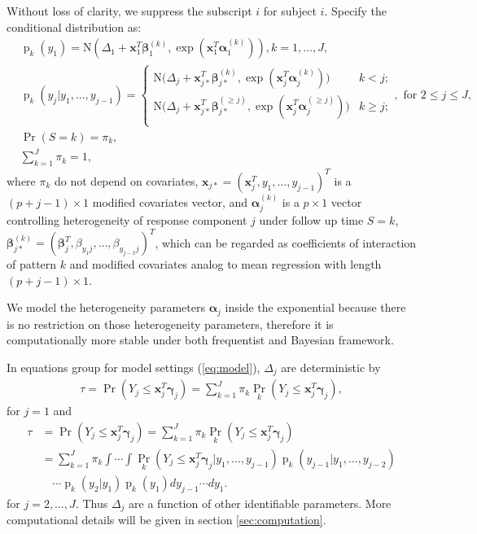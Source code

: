 \documentclass[12pt]{article}
\DeclareMathOperator{\pr}{p}
\DeclareMathOperator{\prob}{Pr}
\begin{document}
Without loss of clarity, we suppress the subscript $i$ for subject
$i$. Specify the conditional distribution as:
\begin{align}
  & \pr_k(y_1) = \textrm{N} (\Delta_1 + \bm x_1^T \bm \beta_1^{(k)}, 
\exp (\bm x_{1}^T \bm \alpha_1^{(k)} ) ), k = 1, \ldots, J, \label{eq:model}\\
  &\pr_k(y_j|y_1, \ldots, y_{j-1}) =
  \begin{cases}
    \textrm{N} \big (\Delta_j + \bm x_{j*}^T \bm \beta_{j*}^{(k)}, 
\exp (\bm x_{j}^T \bm \alpha_j^{(k)} ) \big) & k < j ;  \nonumber \\
    \textrm{N} \big (\Delta_j + \bm x_{j*}^T \bm \beta_{j*}^{(\geq j)}, 
\exp (\bm x_{j}^T \bm \alpha_j^{(\geq j)} ) \big) & k \geq j ; \nonumber \\
  \end{cases}, \text{ for } 2 \leq j \leq J, \nonumber \\
  & \prob (S = k)  = \pi_k, \nonumber \\
  & \sum_{k=1}^J \pi_k = 1, \nonumber
\end{align}
where $\pi_k$ do not depend on covariates, $\bm x_{j*} = (\bm x_j^T, y_1,
\ldots, y_{j-1})^T$ is a $(p + j - 1) \times 1$ modified covariates
vector, and $\bm \alpha_j^{(k)}$ is a $p \times 1$ vector controlling
heterogeneity of response component $j$ under follow up time $S = k$,
$\bm \beta_{j*}^{(k)} = (\bm \beta_j^T, \beta_{y_1j}, \ldots,
\beta_{y_{j-1}j})^T$, which can be regarded as coefficients of
interaction of pattern $k$ and modified covariates analog to mean
regression with length $ (p + j - 1) \times 1$.

We model the heterogeneity parameters $\bm \alpha_j$ inside the exponential
because there is no restriction on those heterogeneity parameters,
therefore it is computationally more stable under both frequentist and
Bayesian framework.

In equations group for model settings (\ref{eq:model}), $\Delta_j$ are
deterministic by
\begin{align}
  \label{eq:deltaeqn1}
  \tau = \prob (Y_j \leq \bm x_j^T \bm \gamma_j ) = \sum_{k=1}^J 
\pi_k\prob_k (Y_j \leq
  \bm x_j^T \bm \gamma_j ),
\end{align}
for $j = 1$ and
\begin{align}\label{eq:deltaeqn2}
  \tau &= \prob (Y_j \leq \bm x_j^{T} \bm \gamma_j ) = \sum_{k=1}^J 
\pi_k\prob_k (Y_j \leq \bm x_j^{T} \bm \gamma_j ) \\
  & = \sum_{k=1}^J \pi_k \int\cdots \int \prob_k (Y_j \leq \bm x_j^{T} 
\bm \gamma_j |y_1,\ldots,
  y_{j-1}) \pr_k (y_{j-1}| y_1, \ldots, y_{j-2})  \nonumber \\
& \quad \cdots \pr_k (y_{2}| y_1) \pr_k(y_1) dy_{j-1}\cdots dy_1. \nonumber
\end{align}
for $j = 2, \ldots, J$. Thus $\Delta_j$ are a function of other
identifiable parameters. More computational details will be given in
section \ref{sec:computation}.
\end{document}
